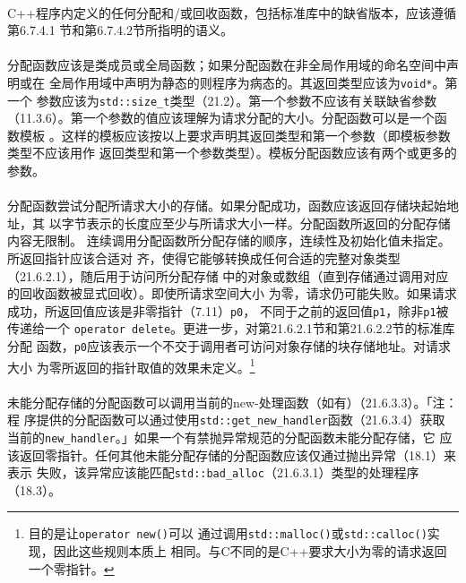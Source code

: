 \paragraph{}
C++程序内定义的任何分配和/或回收函数，包括标准库中的缺省版本，应该遵循第6.7.4.1
节和第6.7.4.2节所指明的语义。

\paragraph{}
分配函数应该是类成员或全局函数；如果分配函数在非全局作用域的命名空间中声明或在
全局作用域中声明为静态的则程序为病态的。其返回类型应该为\texttt{void*}。第一个
参数应该为\texttt{std::size\_t}类型（21.2）。第一个参数不应该有关联缺省参数
（11.3.6）。第一个参数的值应该理解为请求分配的大小。分配函数可以是一个函数模板
。这样的模板应该按以上要求声明其返回类型和第一个参数（即模板参数类型不应该用作
返回类型和第一个参数类型）。模板分配函数应该有两个或更多的参数。

\paragraph{}
分配函数尝试分配所请求大小的存储。如果分配成功，函数应该返回存储块起始地址，其
以字节表示的长度应至少与所请求大小一样。分配函数所返回的分配存储内容无限制。
连续调用分配函数所分配存储的顺序，连续性及初始化值未指定。所返回指针应该合适对
齐，使得它能够转换成任何合适的完整对象类型（21.6.2.1），随后用于访问所分配存储
中的对象或数组（直到存储通过调用对应的回收函数被显式回收）。即使所请求空间大小
为零，请求仍可能失败。如果请求成功，所返回值应该是非零指针（7.11）\texttt{p0}，
不同于之前的返回值\texttt{p1}，除非\texttt{p1}被传递给一个
\texttt{operator delete}。更进一步，对第21.6.2.1节和第21.6.2.2节的标准库分配
函数，\texttt{p0}应该表示一个不交于调用者可访问对象存储的块存储地址。对请求大小
为零所返回的指针取值的效果未定义。\footnote{目的是让\texttt{operator new()}可以
通过调用\texttt{std::malloc()}或\texttt{std::calloc()}实现，因此这些规则本质上
相同。与C不同的是C++要求大小为零的请求返回一个零指针。}

\paragraph{}
未能分配存储的分配函数可以调用当前的new-处理函数（如有）（21.6.3.3）。「注：程
序提供的分配函数可以通过使用\texttt{std::get\_new\_handler}函数（21.6.3.4）获取
当前的\texttt{new\_handler}。」如果一个有禁抛异常规范的分配函数未能分配存储，它
应该返回零指针。任何其他未能分配存储的分配函数应该仅通过抛出异常（18.1）来表示
失败，该异常应该能匹配\texttt{std::bad\_alloc}（21.6.3.1）类型的处理程序
（18.3）。

